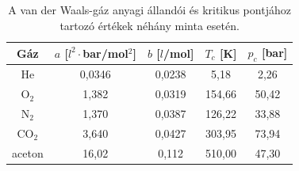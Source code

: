 \begin{table}[h!]
\centering
\begin{tabular}{|c|c|c|c|c|} \hline
Gáz & $a$ [$l^2\cdot$bar/mol$^2$] & $b$ [$l$/mol] & $T_c$ [K] & $p_c$ [bar]\\ \hline\hline
He & 0{,}0346 & 0{,}0238 & 5{,}18 & 2{,}26\\ \hline
O$_2$ & 1{,}382 & 0{,}0319 & 154{,}66 & 50{,}42\\ \hline
N$_2$ & 1{,}370 & 0{,}0387 & 126{,}22 & 33{,}88\\ \hline
CO$_2$ & 3{,}640 & 0{,}0427 & 303{,}95 & 73{,}94 \\ \hline
aceton & 16{,}02 & 0{,}112 & 510{,}00 & 47{,}30\\ \hline
\end{tabular}
\caption{A van der Waals-gáz anyagi állandói és kritikus pontjához tartozó értékek néhány minta esetén.}
\label{tab:vdW}
\end{table}